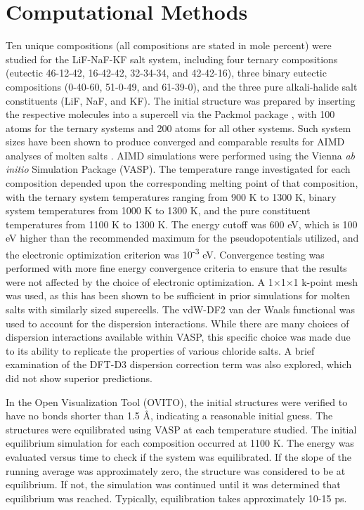 \documentclass[preprint,12pt]{elsarticle}
\begin{document}
\section{Computational Methods}
Ten unique compositions (all compositions are stated in mole percent) were studied for the LiF-NaF-KF salt system, including four ternary compositions (eutectic 46-12-42, 16-42-42, 32-34-34, and 42-42-16), three binary eutectic compositions (0-40-60, 51-0-49, and 61-39-0), and the three pure alkali-halide salt constituents (LiF, NaF, and KF). The initial structure was prepared by inserting the respective molecules into a supercell via the Packmol package \cite{Packmol}, with 100 atoms for the ternary systems and 200 atoms for all other systems. Such system sizes have been shown to produce converged and comparable results for AIMD analyses of molten salts \cite{Bengtson2013,Andersson2022}. AIMD simulations were performed using the Vienna \textit{ab initio} Simulation Package (VASP)\cite{VASP1,VASP2,VASP3}. The temperature range investigated for each composition depended upon the corresponding melting point of that composition, with the ternary system temperatures ranging from 900 K to 1300 K, binary system temperatures from 1000 K to 1300 K, and the pure constituent temperatures from 1100 K to 1300 K. The energy cutoff was 600 eV, which is 100 eV higher than the recommended maximum for the pseudopotentials utilized, and the electronic optimization criterion was 10\textsuperscript{-3} eV. Convergence testing was performed with more fine energy convergence criteria to ensure that the results were not affected by the choice of electronic optimization. A 1$\times$1$\times$1 k-point mesh was used, as this has been shown to be sufficient in prior simulations for molten salts with similarly sized supercells\cite{Duemmler2022,Nam2014}. The vdW-DF2 van der Waals functional was used to account for the dispersion interactions\cite{vdWDFT1,vdWDFT2}. While there are many choices of dispersion interactions available within VASP, this specific choice was made due to its ability to replicate the properties of various chloride salts\cite{Duemmler2022}. A brief examination of the DFT-D3 dispersion correction term \cite{grimme2010} was also explored, which did not show superior predictions.

In the Open Visualization Tool (OVITO)\cite{Ovito}, the initial structures were verified to have no bonds shorter than 1.5 \AA, indicating a reasonable initial guess. The structures were equilibrated using VASP at each temperature studied. The initial equilibrium simulation for each composition occurred at 1100 K. The energy was evaluated versus time to check if the system was equilibrated. If the slope of the running average was approximately zero, the structure was considered to be at equilibrium. If not, the simulation was continued until it was determined that equilibrium was reached. Typically, equilibration takes approximately 10-15 ps.
\end{document}
